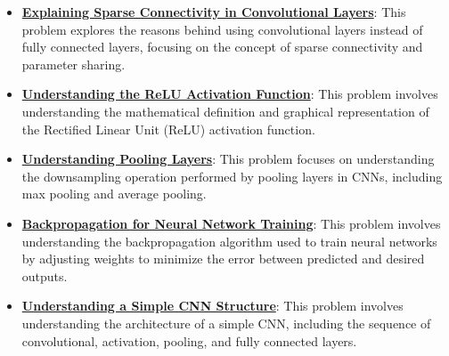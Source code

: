 \documentclass{article}%
\begin{document}
\begin{itemize}[leftmargin=*]
\item \href{https://purdue.brightspace.com/d2l/common/assets/pdfjs-d2l-dist/1.0.14-legacy/web/viewer.html?file=\%2Fcontent\%2Fenforced\%2F1095467-wl.202510.CS.24300.001\%2F09L1-cnn.pdf\%3Fou\%3D1095467\&lang=en-us\&container=d2l-fileviewer-rendered-pdf\&fullscreen=d2l-fileviewer-rendered-pdf-dialog\&height=667#page=10}{\textbf{Explaining Sparse Connectivity in Convolutional Layers}}: This problem explores the reasons behind using convolutional layers instead of fully connected layers, focusing on the concept of sparse connectivity and parameter sharing.%
\item \href{https://purdue.brightspace.com/d2l/common/assets/pdfjs-d2l-dist/1.0.14-legacy/web/viewer.html?file=\%2Fcontent\%2Fenforced\%2F1095467-wl.202510.CS.24300.001\%2F09L1-cnn.pdf\%3Fou\%3D1095467\&lang=en-us\&container=d2l-fileviewer-rendered-pdf\&fullscreen=d2l-fileviewer-rendered-pdf-dialog\&height=667#page=13}{\textbf{Understanding the ReLU Activation Function}}: This problem involves understanding the mathematical definition and graphical representation of the Rectified Linear Unit (ReLU) activation function.%
\item \href{https://purdue.brightspace.com/d2l/common/assets/pdfjs-d2l-dist/1.0.14-legacy/web/viewer.html?file=\%2Fcontent\%2Fenforced\%2F1095467-wl.202510.CS.24300.001\%2F09L1-cnn.pdf\%3Fou\%3D1095467\&lang=en-us\&container=d2l-fileviewer-rendered-pdf\&fullscreen=d2l-fileviewer-rendered-pdf-dialog\&height=667#page=14}{\textbf{Understanding Pooling Layers}}: This problem focuses on understanding the downsampling operation performed by pooling layers in CNNs, including max pooling and average pooling.%
\item \href{https://purdue.brightspace.com/d2l/common/assets/pdfjs-d2l-dist/1.0.14-legacy/web/viewer.html?file=\%2Fcontent\%2Fenforced\%2F1095467-wl.202510.CS.24300.001\%2F09L1-cnn.pdf\%3Fou\%3D1095467\&lang=en-us\&container=d2l-fileviewer-rendered-pdf\&fullscreen=d2l-fileviewer-rendered-pdf-dialog\&height=667#page=16}{\textbf{Backpropagation for Neural Network Training}}: This problem involves understanding the backpropagation algorithm used to train neural networks by adjusting weights to minimize the error between predicted and desired outputs.%
\item \href{https://purdue.brightspace.com/d2l/common/assets/pdfjs-d2l-dist/1.0.14-legacy/web/viewer.html?file=\%2Fcontent\%2Fenforced\%2F1095467-wl.202510.CS.24300.001\%2F09L1-cnn.pdf\%3Fou\%3D1095467\&lang=en-us\&container=d2l-fileviewer-rendered-pdf\&fullscreen=d2l-fileviewer-rendered-pdf-dialog\&height=667#page=17}{\textbf{Understanding a Simple CNN Structure}}: This problem involves understanding the architecture of a simple CNN, including the sequence of convolutional, activation, pooling, and fully connected layers.%

\end{itemize}
\end{document}
